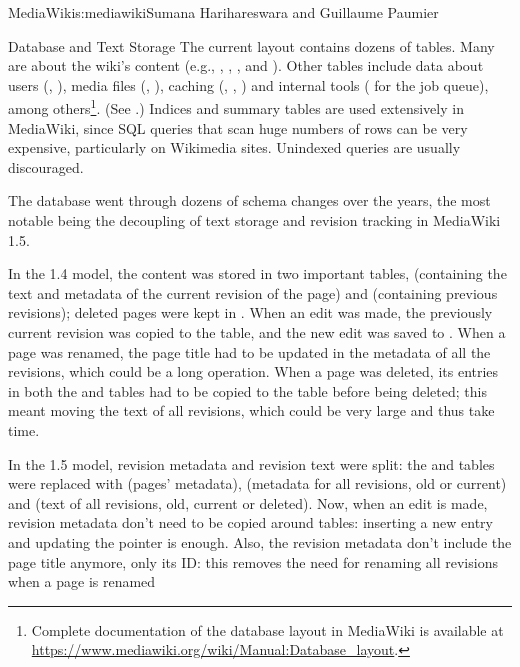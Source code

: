\begin{aosachapter}{MediaWiki}{s:mediawiki}{Sumana Harihareswara and Guillaume Paumier}
\begin{aosasect1}{Database and Text Storage}
The current layout contains dozens of tables. Many are about the
wiki's content (e.g., , , ,
and ). Other tables include data about users
(,\linebreak 
{}), media files (,
), caching (, , \linebreak
{}) and internal tools ( for the job queue),
among others\footnote{Complete documentation of the database layout in
  MediaWiki is available at
  \url{https://www.mediawiki.org/wiki/Manual:Database_layout}.}. (See
.) Indices
and summary tables are used extensively in MediaWiki, since SQL
queries that scan huge numbers of rows can be very expensive,
particularly on Wikimedia sites. Unindexed queries are usually
discouraged.

The database went through dozens of schema changes over the years, the
most notable being the decoupling of text storage and revision
tracking in MediaWiki 1.5.


In the 1.4 model, the content was stored in two important tables,
 (containing the text and metadata of the current revision
of the page) and  (containing previous revisions); deleted
pages were kept in . When an edit was made, the
previously current revision was copied to the  table, and
the new edit was saved to . When a page was renamed, the
page title had to be updated in the metadata of all the 
revisions, which could be a long operation. When a page was deleted,
its entries in both the  and  tables had to be
copied to the  table before being deleted; this meant
moving the text of all revisions, which could be very large and thus
take time.

In the 1.5 model, revision metadata and revision text were split: the
 and  tables were replaced with  (pages'
metadata),  (metadata for all revisions, old or
current) and  (text of all revisions, old, current or
deleted). Now, when an edit is made, revision metadata don't need to
be copied around tables: inserting a new entry and updating the
 pointer is enough. Also, the revision metadata
don't include the page title anymore, only its ID: this removes the
need for renaming all revisions when a page is renamed


\end{aosasect1}
\end{aosachapter}
